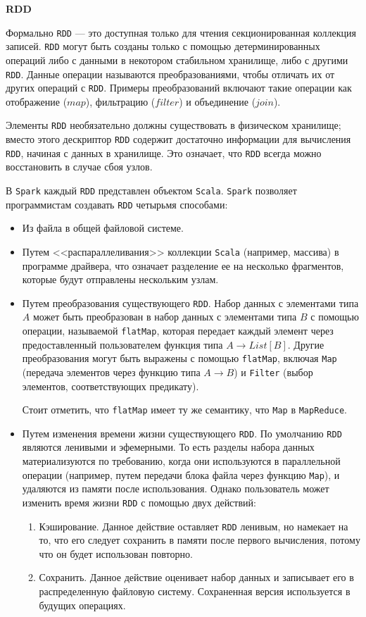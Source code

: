 \textbf{RDD}

Формально \texttt{RDD} --- это доступная только для чтения секционированная коллекция записей. 
\texttt{RDD} могут быть созданы только с помощью детерминированных операций либо с данными в некотором стабильном хранилище, либо с другими \texttt{RDD}. 
Данные операции называются преобразованиями, чтобы отличать их от других операций с \texttt{RDD}. 
Примеры преобразований включают такие операции как отображение ($map$), фильтрацию ($filter$) и объединение ($join$).

Элементы \texttt{RDD} необязательно должны существовать в физическом хранилище; 
вместо этого дескриптор \texttt{RDD} содержит достаточно информации для вычисления \texttt{RDD}, начиная с данных в хранилище. 
Это означает, что \texttt{RDD} всегда можно восстановить в случае сбоя узлов. 

В \texttt{Spark} каждый \texttt{RDD} представлен объектом \texttt{Scala}.
\texttt{Spark} позволяет программистам создавать \texttt{RDD} четырьмя способами:

\begin{itemize}
  \item Из файла в общей файловой системе.
  \item Путем <<распараллеливания>> коллекции \texttt{Scala} (например, массива) в программе драйвера, что означает разделение ее на несколько фрагментов, которые будут отправлены нескольким узлам.
  \item Путем преобразования существующего \texttt{RDD}. 
    Набор данных с элементами типа $A$ может быть преобразован в набор данных с элементами типа $B$ с помощью операции, называемой \texttt{flatMap}, которая передает каждый элемент через предоставленный пользователем функция типа $A \rightarrow List[B]$. 
    Другие преобразования могут быть выражены с помощью \texttt{flatMap}, включая \texttt{Map} (передача элементов через функцию типа $A \rightarrow B$) и \texttt{Filter} (выбор элементов, соответствующих предикату).
    
    Стоит отметить, что \texttt{flatMap} имеет ту же семантику, что \texttt{Map} в \texttt{MapReduce}.
  \item Путем изменения времени жизни существующего \texttt{RDD}.
    По умолчанию \texttt{RDD} являются ленивыми и эфемерными. 
    То есть разделы набора данных материализуются по требованию, когда они используются в параллельной операции (например, путем передачи блока файла через функцию \texttt{Map}), и удаляются из памяти после использования. 
    Однако пользователь может изменить время жизни \texttt{RDD} с помощью двух действий:
    \begin{enumerate}
      \item Кэширование. 
        Данное действие оставляет \texttt{RDD} ленивым, но намекает на то, что его следует сохранить в памяти после первого вычисления, потому что он будет использован повторно.
      \item Сохранить. 
        Данное действие оценивает набор данных и записывает его в распределенную файловую систему. 
        Сохраненная версия используется в будущих операциях.
    \end{enumerate}
\end{itemize}

